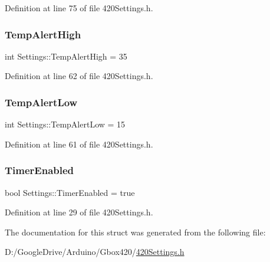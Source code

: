 Definition at line 75 of file 420\+Settings.\+h.

\mbox{\label{struct_settings_a82a8c74eaac47ab4be913690cdb3fa44}} 
\subsubsection{\texorpdfstring{TempAlertHigh}{TempAlertHigh}}
{\footnotesize\ttfamily int Settings\+::\+Temp\+Alert\+High = 35}



Definition at line 62 of file 420\+Settings.\+h.

\mbox{\label{struct_settings_a59dc94676139ca6cb989cf4309cb08ef}} 
\subsubsection{\texorpdfstring{TempAlertLow}{TempAlertLow}}
{\footnotesize\ttfamily int Settings\+::\+Temp\+Alert\+Low = 15}



Definition at line 61 of file 420\+Settings.\+h.

\mbox{\label{struct_settings_accf09a0ab1d5cc8d12f3cb9e934612bf}} 
\subsubsection{\texorpdfstring{TimerEnabled}{TimerEnabled}}
{\footnotesize\ttfamily bool Settings\+::\+Timer\+Enabled = true}



Definition at line 29 of file 420\+Settings.\+h.



The documentation for this struct was generated from the following file\+:\begin{DoxyCompactItemize}
\item 
D\+:/\+Google\+Drive/\+Arduino/\+Gbox420/\mbox{\hyperlink{420_settings_8h}{420\+Settings.\+h}}\end{DoxyCompactItemize}
